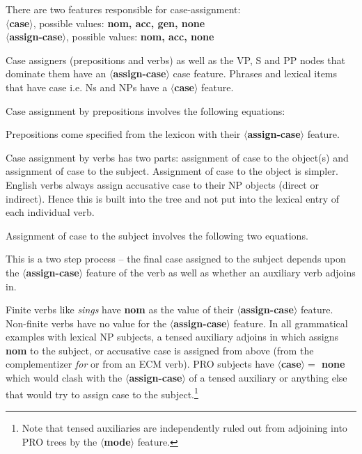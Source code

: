 There are two features responsible for case-assignment:\\
{\bf $\langle$case$\rangle$}, possible values: {\bf nom, acc, gen, none}\\
{\bf $\langle$assign-case$\rangle$}, possible values: {\bf nom, acc, none}

Case assigners (prepositions and verbs) as well as the VP, S and PP
nodes that dominate them have an {\bf $\langle$assign-case$\rangle$}
case feature. Phrases and lexical items that have case i.e. Ns and NPs
have a {\bf $\langle$case$\rangle$} feature.

Case assignment by prepositions involves the following equations:




Prepositions come specified from the lexicon with their {\bf $\langle$assign-case$\rangle$}
feature.



Case assignment by verbs has two parts: assignment of case to the
object(s) and assignment of case to the subject. Assignment of case to
the object is simpler.  English verbs always assign accusative case to
their NP objects (direct or indirect).  Hence this is built into the
tree and not put into the lexical entry of each individual verb.


Assignment of case to the subject involves the following two equations.




This is a two step process -- the final case assigned to the subject
depends upon the {\bf $\langle$assign-case$\rangle$} feature of the
verb as well as whether an auxiliary verb adjoins in.

Finite verbs like {\em sings} have {\bf nom} as the value of their
{\bf $\langle$assign-case$\rangle$} feature. Non-finite verbs have
no value for the {\bf $\langle$assign-case$\rangle$}
feature. In all grammatical examples with lexical NP subjects, a tensed
auxiliary adjoins in which assigns {\bf nom} to the subject, or accusative case
is assigned from above (from the complementizer {\it for} or from an ECM
verb). PRO subjects have {\bf $\langle$case$\rangle =$ none} which would clash
with the {\bf $\langle$assign-case$\rangle$} of a tensed auxiliary or anything
else that would try to assign case to the subject.\footnote{Note that tensed
auxiliaries are independently ruled out from adjoining into PRO trees by the
{\bf $\langle$mode$\rangle$} feature.}

